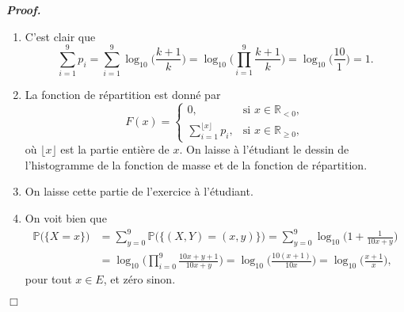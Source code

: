 \documentclass[11pt,a4paper]{article}
\newcommand{\RR}{\mathbb{R}}
\newenvironment{preuve}[1][]
{\vskip 2mm  \noindent\emph{\bf Proof#1. }}{$\Box$ \vskip 2mm}
\let\geq\geqslant
\newcounter{exercice}
\begin{document}
		\begin{preuve}
			\begin{enumerate}
				\item C'est clair que 
				\[      \sum_{i=1}^{9} p_{i} = \sum_{i=1}^{9} \log_{10}\bigg(\frac{k+1}{k}\bigg) = \log_{10}\bigg(\prod_{i=1}^{9} \frac{k+1}{k}\bigg) = 
				\log_{10}\bigg(\frac{10}{1}\bigg) = 1.     \]
				
				\item La fonction de répartition est donné par 
				\[     F(x) = \begin{cases}
				0, &\text{si $x \in \RR_{<0}$},
				\\
				\sum_{i=1}^{\lfloor x \rfloor} p_{i}, &\text{si $x \in \RR_{\geq 0}$},
				\end{cases}
				\]
				où $\lfloor x \rfloor$ est la partie entière de $x$. 
				On laisse à l'étudiant le dessin de l'histogramme de la fonction de masse et de la fonction de répartition.
				
				\item On laisse cette partie de l'exercice à l'étudiant. 
				
				\item On voit bien que  
				\begin{align*}     \mathbb{P}\big( \{ X=x \} \big) &= \sum_{y=0}^{9} \mathbb{P}\Big(\big\{ (X,Y)=(x,y) \big\}\Big) = \sum_{y=0}^{9} \log_{10}\bigg(1+\frac{1}{10x+y}\bigg) 
				\\
				&= \log_{10}\bigg(\prod_{i=0}^{9} \frac{10 x + y + 1}{10x+y} \bigg) = \log_{10}\bigg(\frac{10 (x + 1)}{10x} \bigg) =  \log_{10}\bigg(\frac{x + 1}{x} \bigg),      
				\end{align*}
				pour tout $x \in E$, et zéro sinon. 
			\end{enumerate}
		\end{preuve}
		
\end{document}
